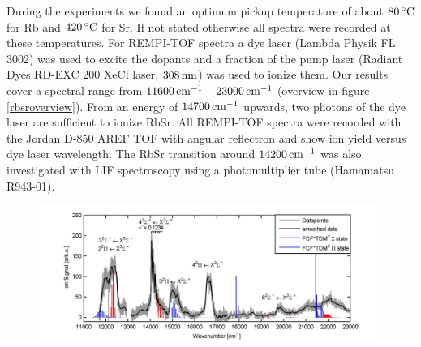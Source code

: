 \documentclass[parskip,12pt,headsepline,a4paper] {scrbook}
\begin{document}
During the experiments we found an optimum pickup temperature of about $\unit[80]{^\circ C}$ for Rb and $\unit[420]{^\circ C}$ for Sr. If not stated otherwise all spectra were recorded at these temperatures. For REMPI-TOF spectra a dye laser (Lambda Physik FL 3002) was used to excite the dopants and a fraction of the pump laser (Radiant Dyes RD-EXC 200 XeCl laser, $\unit[308]{nm}$) was used to ionize them. Our results cover a spectral range from $\unit[11600]{cm^{-1}}$ - $\unit[23000]{cm^{-1}}$ (overview in figure \ref{rbsroverview}). From an energy of $\unit[14700]{cm^{-1}}$ upwards, two photons of the dye laser are sufficient to ionize RbSr. All REMPI-TOF spectra were recorded with the Jordan D-850 AREF TOF with angular reflectron and show ion yield versus dye laser wavelength. The RbSr transition around $\unit[14200]{cm^{-1}}$ was also investigated with LIF spectroscopy using a photomultiplier tube (Hamamatsu R943-01). %

\begin{figure}[ht]
\centerline{
\includegraphics[width=18cm]{./resultsRbSr/overview.jpg}}
\end{figure}
\end{document}
